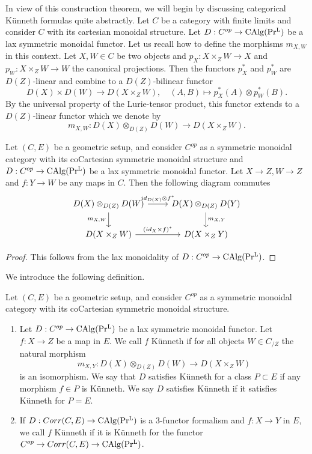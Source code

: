 In view of this construction theorem, we will begin by discussing categorical Künneth formulas quite abstractly. Let $C$ be a category with finite limits and consider  $C$ with its cartesian monoidal structure. Let  $D: C^{op}\to \operatorname{CAlg}(\operatorname{Pr^{L}})$ be a lax symmetric monoidal functor. Let us recall how to define the morphisms $m_{X,W}$ in this context.
Let $X,W\in C$ be two objects and $p_X : X\times_Z W \to X$ and $p_W : X \times_Z W\to W$ the canonical projections. Then the functors  $p_X^*$ and $p_W^*$ are $D(Z)$-linear and combine to a $D(Z)$-bilinear functor 
\[
D(X)\times D(W) \to D(X \times_Z W), \quad (A, B) \mapsto p_X^*(A) \otimes p_W^*(B).
\]
By the universal property of the Lurie-tensor product, this functor extends to a $D(Z)$-linear functor which we denote by
\[
m_{X,W}: D(X)\otimes_{D(Z)} D(W) \to D(X \times_Z W).
\]

\begin{lemma}\label{naturality of m1}
Let $(C,E)$ be a geometric setup, and consider $C^{op}$ as a symmetric monoidal category with its coCartesian symmetric monoidal structure and $D: C^{op} \to \operatorname{CAlg}(\operatorname{Pr^{L}})$ be a lax symmetric monoidal functor. Let $X\to Z, W \to Z$ and $f: Y\to W$ be any maps in $C$. Then the following diagram commutes
\[\begin{tikzcd}
	{D(X)\otimes_{D(Z)}D(W)} & {D(X)\otimes_{D(Z)}D(Y)} \\
	{D(X\times_Z W)} & {D(X\times_Z Y)}
	\arrow["{id_{D(X)}\otimes f^*}", from=1-1, to=1-2]
	\arrow["{(id_X\times f)^*}", from=2-1, to=2-2]
	\arrow["{m_{X,W}}"', from=1-1, to=2-1]
	\arrow["{m_{X,Y}}", from=1-2, to=2-2]
\end{tikzcd}
\]
\end{lemma}
\begin{proof}
This follows from the lax monoidality of $D: C^{op} \to \operatorname{CAlg}(\operatorname{Pr^{L}})$.
\end{proof}


We introduce the following definition.
\begin{definition}\label{def.künneth6f}
Let $(C,E)$ be a geometric setup, and consider $C^{op}$ as a symmetric monoidal category with its coCartesian symmetric monoidal structure. 
\begin{enumerate}
    \item Let $D: C^{op} \to \operatorname{CAlg}(\operatorname{Pr^{L}})$ be a lax symmetric monoidal functor. Let $f: X\to Z$ be a map in $E$. We call $f$ Künneth if for all objects $W \in C_{/Z}$ the natural morphism 
\[
m_{X,Y} : D(X)\otimes_{D(Z)} D(W) \to  D(X\times_Z W)
\]
is an isomorphism. We say that $D$ satisfies Künneth for a class $P \subset E$ if any morphism $f \in P$ is Künneth. We say $D$ satisfies Künneth if it satisfies Künneth for $P=E$.
\item If $D: Corr(C,E) \to \operatorname{CAlg}(\operatorname{Pr^{L}})$ is a $3$-functor formalism and $f: X \to Y$ in $E$, we call $f$ Künneth if it is Künneth for the functor $C^{op}\to Corr(C,E)\to \operatorname{CAlg}(\operatorname{Pr^{L}})$. 
\end{enumerate}
\end{definition}


